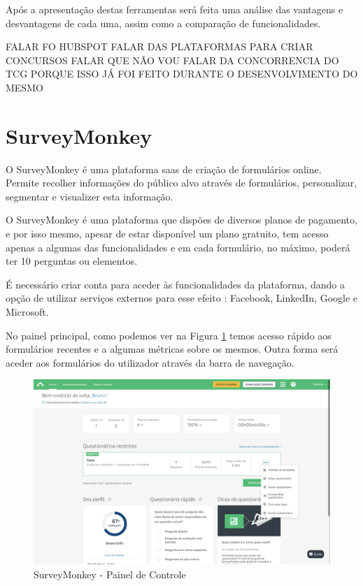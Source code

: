 Após a apresentação destas ferramentas será feita uma análise das vantagens e desvantagens de cada uma, assim como a comparação de funcionalidades.

FALAR FO HUBSPOT
FALAR DAS PLATAFORMAS PARA CRIAR CONCURSOS
FALAR QUE NÃO VOU FALAR DA CONCORRENCIA DO TCG PORQUE ISSO JÁ FOI FEITO DURANTE O DESENVOLVIMENTO DO MESMO

\section{SurveyMonkey}
\label{surveyMonkey}

O SurveyMonkey é uma plataforma \acrfull{saas} de criação de formulários online. Permite recolher informações do público alvo através de formulários, personalizar, segmentar e visualizer esta informação.

O SurveyMonkey é uma plataforma que dispões de diversos planos de pagamento, e por isso mesmo, apesar de estar disponível um plano gratuito, tem acesso apenas a algumas das funcionalidades e em cada formulário, no máximo, poderá ter 10 perguntas ou elementos.

É necessário criar conta para aceder às funcionalidades da plataforma, dando a opção de utilizar serviços externos para esse efeito : Facebook\cite{face}, LinkedIn, Google\cite{gaccount} e Microsoft\cite{microsoft}.

No painel principal, como podemos ver na Figura \ref{fig:survey-dashboard} temos acesso rápido aos formulários recentes e a algumas métricas sobre os mesmos. Outra forma será aceder aos formulários do utilizador através da barra de navegação. 


\begin{figure}[ht!]
	\begin{center}
		\includegraphics[width=1\textwidth]{img/sm/survey-dashboard}
		\caption{SurveyMonkey - Painel de Controle }
		\label{fig:survey-dashboard}
	\end{center}
\end{figure}

